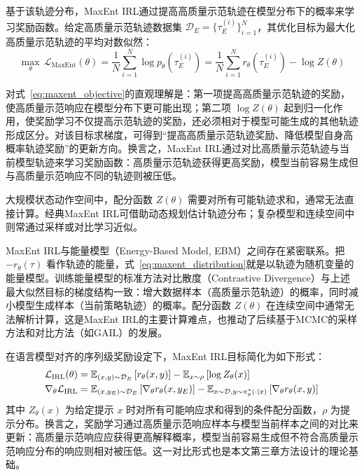 基于该轨迹分布，MaxEnt IRL通过提高高质量示范轨迹在模型分布下的概率来学习奖励函数。给定高质量示范轨迹数据集 $\mathcal{D}_E = \{\tau_E^{(i)}\}_{i=1}^N$，其优化目标为最大化高质量示范轨迹的平均对数似然：
\begin{equation}
    \max_\theta\, \mathcal{L}_{\text{MaxEnt}}(\theta) = \frac{1}{N}\sum_{i=1}^N \log p_\theta(\tau_E^{(i)}) = \frac{1}{N}\sum_{i=1}^N r_\theta(\tau_E^{(i)}) - \log Z(\theta)
    \label{eq:maxent_objective}
\end{equation}

对式~\eqref{eq:maxent_objective}的直观理解是：第一项提高高质量示范轨迹的奖励，使高质量示范响应在模型分布下更可能出现；第二项 $\log Z(\theta)$ 起到归一化作用，使奖励学习不仅提高示范轨迹的奖励，还必须相对于模型可能生成的其他轨迹形成区分。对该目标求梯度，可得到“提高高质量示范轨迹奖励、降低模型自身高概率轨迹奖励”的更新方向。换言之，MaxEnt IRL通过对比高质量示范轨迹与当前模型轨迹来学习奖励函数：高质量示范轨迹获得更高奖励，模型当前容易生成但与高质量示范响应不同的轨迹则被压低。

大规模状态动作空间中，配分函数 $Z(\theta)$ 需要对所有可能轨迹求和，通常无法直接计算。经典MaxEnt IRL可借助动态规划估计轨迹分布；复杂模型和连续空间中则常通过采样或对比学习近似。

MaxEnt IRL与能量模型（Energy-Based Model, EBM）之间存在紧密联系\cite{wulfmeier2024irl}。把 $-r_\theta(\tau)$ 看作轨迹的能量，式~\eqref{eq:maxent_distribution}就是以轨迹为随机变量的能量模型。训练能量模型的标准方法对比散度（Contrastive Divergence）与上述最大似然目标的梯度结构一致：增大数据样本（高质量示范轨迹）的概率，同时减小模型生成样本（当前策略轨迹）的概率。配分函数 $Z(\theta)$ 在连续空间中通常无法解析计算，这是MaxEnt IRL的主要计算难点，也推动了后续基于MCMC的采样方法和对比方法（如GAIL）的发展。

在语言模型对齐的序列级奖励设定下，MaxEnt IRL目标简化为如下形式：
\begin{align}
    \mathcal{L}_{\text{IRL}}(\theta) &= \mathbb{E}_{(x,y) \sim \mathcal{D}_E}\left[r_\theta(x, y)\right] - \mathbb{E}_{x\sim\rho}\left[\log Z_\theta(x)\right] \notag \\
    \nabla_\theta \mathcal{L}_{\text{IRL}} &= \mathbb{E}_{(x,y_E) \sim \mathcal{D}_E}\left[\nabla_\theta r_\theta(x, y_E)\right] - \mathbb{E}_{x \sim \mathcal{D}, y \sim \pi^*_\theta(\cdot|x)}\left[\nabla_\theta r_\theta(x, y)\right]
    \label{eq:maxent_seq}
\end{align}
其中 $Z_\theta(x)$ 为给定提示 $x$ 时对所有可能响应求和得到的条件配分函数，$\rho$ 为提示分布。换言之，奖励学习通过高质量示范响应样本与模型当前样本之间的对比来更新：高质量示范响应应获得更高解释概率，模型当前容易生成但不符合高质量示范响应分布的响应则相对被压低。这一对比形式也是本文第三章方法设计的理论基础。


